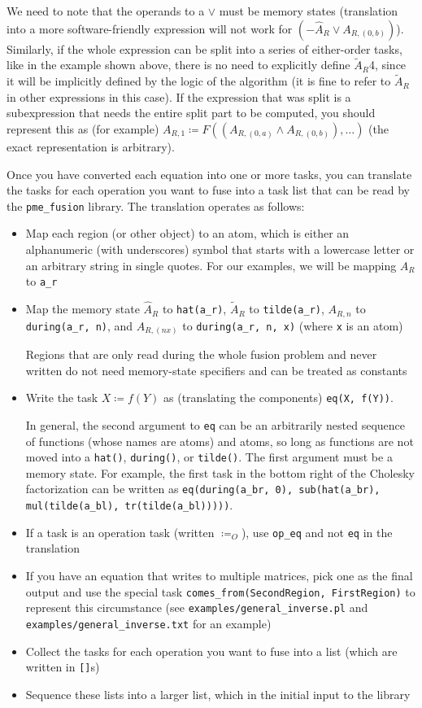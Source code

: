 \documentclass[12pt,letterpaper]{article}
\begin{document}
We need to note that the operands to a $\vee$ must be memory states (translation into a more software-friendly expression will not work for $(-\hat{A}_R \vee A_{R, (0, b)})$).
Similarly, if the whole expression can be split into a series of either-order tasks, like in the example shown above, there is no need to explicitly define $\widetilde{A}_R$4, since it will be implicitly defined by the logic of the algorithm (it is fine to refer to $\widetilde{A}_R$ in other expressions in this case).
If the expression that was split is a subexpression that needs the entire split part to be computed, you should represent this as (for example) $A_{R, 1} \coloneqq F((A_{R, (0, a)} \wedge A_{R, (0, b)}), \ldots)$ (the exact representation is arbitrary).

Once you have converted each equation into one or more tasks, you can translate the tasks for each operation you want to fuse into a task list that can be read by the \texttt{pme\_fusion} library.
The translation operates as follows:
\begin{itemize}
\item Map each region (or other object) to an atom, which is either an alphanumeric (with underscores) symbol that starts with a lowercase letter or an arbitrary string in single quotes. For our examples, we will be mapping $A_R$ to \texttt{a\_r}
\item Map the memory state $\hat{A}_R$ to \texttt{hat(a\_r)}, $\widetilde{A}_R$ to \texttt{tilde(a\_r)}, $A_{R, n}$ to \texttt{during(a\_r, n)}, and $A_{R, (n x)}$ to \texttt{during(a\_r, n, x)} (where \texttt{x} is an atom)

  Regions that are only read during the whole fusion problem and never written do not need memory-state specifiers and can be treated as constants
\item Write the task $X \coloneqq f(Y)$ as (translating the components) \texttt{eq(X, f(Y))}.

  In general, the second argument to \texttt{eq} can be an arbitrarily nested sequence of functions (whose names are atoms) and atoms, so long as functions are not moved into a \texttt{hat()}, \texttt{during()}, or \texttt{tilde()}. The first argument must be a memory state.
  For example, the first task in the bottom right of the Cholesky factorization can be written as \texttt{eq(during(a\_br, 0), sub(hat(a\_br), mul(tilde(a\_bl), tr(tilde(a\_bl)))))}.
\item If a task is an operation task (written $\coloneqq_O$), use \texttt{op\_eq} and not \texttt{eq} in the translation
\item If you have an equation that writes to multiple matrices, pick one as the final output and use the special task \texttt{comes\_from(SecondRegion, FirstRegion)} to represent this circumstance (see \texttt{examples/general\_inverse.pl} and \texttt{examples/general\_inverse.txt} for an example)
\item Collect the tasks for each operation you want to fuse into a list (which are written in \texttt{[]}s)
\item Sequence these lists into a larger list, which in the initial input to the library
\end{itemize}
\end{document}
